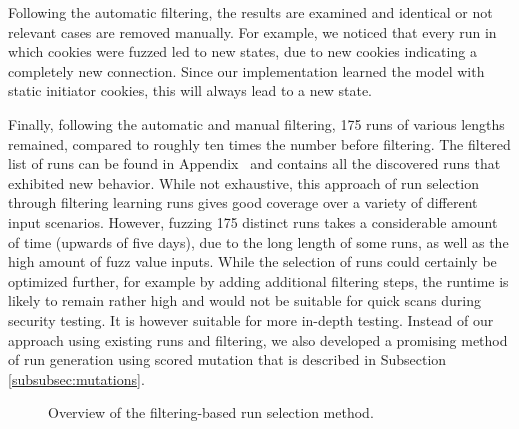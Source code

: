 Following the automatic filtering, the results are examined and identical or not relevant cases are removed manually. For example, we noticed that every run in which cookies were fuzzed led to new states, due to new cookies indicating a completely new connection. Since our implementation learned the model with static initiator cookies, this will always lead to a new state. 

Finally, following the automatic and manual filtering, 175 runs of various lengths remained, compared to roughly ten times the number before filtering. The filtered list of runs can be found in Appendix~ and contains all the discovered runs that exhibited new behavior. While not exhaustive, this approach of run selection through filtering learning runs gives good coverage over a variety of different input scenarios. However, fuzzing 175 distinct runs takes a considerable amount of time (upwards of five days), due to the long length of some runs, as well as the high amount of fuzz value inputs. While the selection of runs could certainly be optimized further, for example by adding additional filtering steps, the runtime is likely to remain rather high and would not be suitable for quick scans during security testing. It is however suitable for more in-depth testing. Instead of our approach using existing runs and filtering, we also developed a promising method of run generation using scored mutation that is described in Subsection \ref{subsubsec:mutations}.

\begin{figure}
\begin{centering}
\caption{Overview of the filtering-based run selection method.}
\label{fig:fuzz_filtering}
\end{centering}
\end{figure}

